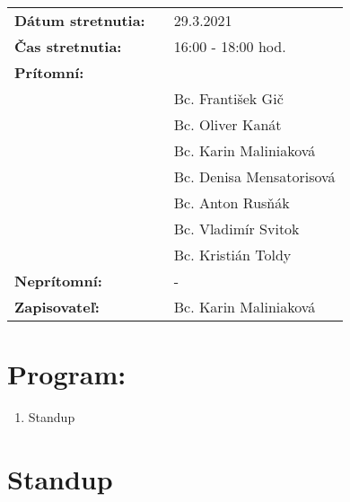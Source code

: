 \documentclass{article}
\begin{document}
    

    \begin{table}[h]
        \begin{tabular}{lllll}
            \multicolumn{3}{l}{\textbf{Dátum stretnutia:}} & & 29.3.2021 \\
            \multicolumn{3}{l}{\textbf{Čas stretnutia:}} & & 16:00 - 18:00 hod. \\
            \multicolumn{3}{l}{\textbf{Prítomní:}} \\
            & & & & Bc. František Gič  \\
            & & & & Bc. Oliver Kanát \\
            & & & & Bc. Karin Maliniaková \\
            & & & & Bc. Denisa Mensatorisová \\
            & & & & Bc. Anton Rusňák \\
            & & & & Bc. Vladimír Svitok \\
            & & & & Bc. Kristián Toldy \\
            \multicolumn{3}{l}{\textbf{Neprítomní:}} & & -\\
            \multicolumn{3}{l}{\textbf{Zapisovateľ:}} & & Bc. Karin Maliniaková \\
        \end{tabular}
        \label{tab:grades}
    \end{table}

    \section*{Program:}

    \begin{enumerate}
        \item Standup
    \end{enumerate}

    \section*{Standup}
\end{document}
